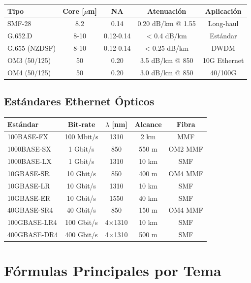 \documentclass[11pt,a4paper]{article}
\begin{document}
\begin{table}[h]
\centering\small
\begin{tabular}{lcccc}
\hline
\textbf{Tipo} & \textbf{Core [$\mu$m]} & \textbf{NA} & \textbf{Atenuación} & \textbf{Aplicación} \\
\hline
SMF-28 & 8.2 & 0.14 & 0.20 dB/km @ 1.55 & Long-haul \\
G.652.D & 8-10 & 0.12-0.14 & < 0.4 dB/km & Estándar \\
G.655 (NZDSF) & 8-10 & 0.12-0.14 & < 0.25 dB/km & DWDM \\
OM3 (50/125) & 50 & 0.20 & 3.5 dB/km @ 850 & 10G Ethernet \\
OM4 (50/125) & 50 & 0.20 & 3.0 dB/km @ 850 & 40/100G \\
\hline
\end{tabular}
\end{table}

\subsection{Estándares Ethernet Ópticos}

\begin{table}[h]
\centering\small
\begin{tabular}{lcccc}
\hline
\textbf{Estándar} & \textbf{Bit-rate} & \textbf{$\lambda$ [nm]} & \textbf{Alcance} & \textbf{Fibra} \\
\hline
100BASE-FX & 100 Mbit/s & 1310 & 2 km & MMF \\
1000BASE-SX & 1 Gbit/s & 850 & 550 m & OM2 MMF \\
1000BASE-LX & 1 Gbit/s & 1310 & 10 km & SMF \\
10GBASE-SR & 10 Gbit/s & 850 & 400 m & OM4 MMF \\
10GBASE-LR & 10 Gbit/s & 1310 & 10 km & SMF \\
10GBASE-ER & 10 Gbit/s & 1550 & 40 km & SMF \\
40GBASE-SR4 & 40 Gbit/s & 850 & 150 m & OM4 MMF \\
100GBASE-LR4 & 100 Gbit/s & 4×1310 & 10 km & SMF \\
400GBASE-DR4 & 400 Gbit/s & 4×1310 & 500 m & SMF \\
\hline
\end{tabular}
\end{table}

\section{Fórmulas Principales por Tema}
\end{document}
